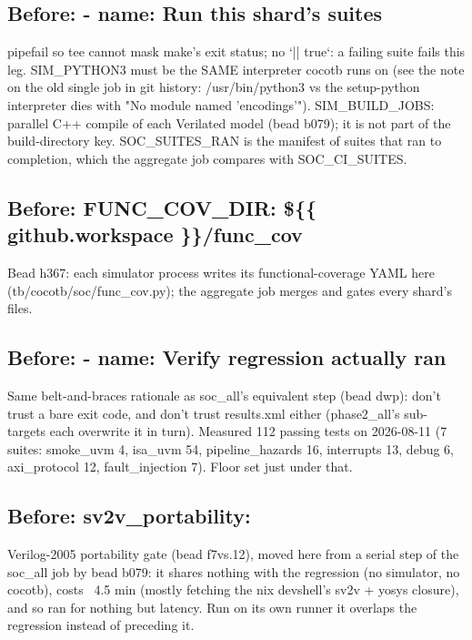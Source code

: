 \begin{record}
\subsection*{Before: - name: Run this shard's suites}

\begin{textblock}
pipefail so tee cannot mask make's exit status; no `|| true`: a failing suite fails this leg.
SIM_PYTHON3 must be the SAME interpreter cocotb runs on (see the note on the old single job in
git history: /usr/bin/python3 vs the setup-python interpreter dies with "No module named
'encodings'").  SIM_BUILD_JOBS: parallel C++ compile of each Verilated model (bead b079); it
is not part of the build-directory key.  SOC_SUITES_RAN is the manifest of suites that ran
to completion, which the aggregate job compares with SOC_CI_SUITES.
\end{textblock}

\subsection*{Before: FUNC\_COV\_DIR: \$\{\{ github.workspace \}\}/func\_cov}

\begin{textblock}
Bead h367: each simulator process writes its functional-coverage YAML here
(tb/cocotb/soc/func_cov.py); the aggregate job merges and gates every shard's files.
\end{textblock}

\subsection*{Before: - name: Verify regression actually ran}

\begin{textblock}
Same belt-and-braces rationale as soc_all's equivalent step (bead
dwp): don't trust a bare exit code, and don't trust results.xml
either (phase2_all's sub-targets each overwrite it in turn).
Measured 112 passing tests on 2026-08-11 (7 suites: smoke_uvm 4,
isa_uvm 54, pipeline_hazards 16, interrupts 13, debug 6,
axi_protocol 12, fault_injection 7). Floor set just under that.
\end{textblock}

\subsection*{Before: sv2v\_portability:}

\begin{textblock}
Verilog-2005 portability gate (bead f7vs.12), moved here from a serial step of the soc_all job
by bead b079: it shares nothing with the regression (no simulator, no cocotb), costs ~4.5 min
(mostly fetching the nix devshell's sv2v + yosys closure), and so ran for nothing but latency.
Run on its own runner it overlaps the regression instead of preceding it.


\end{textblock}
\end{record}
